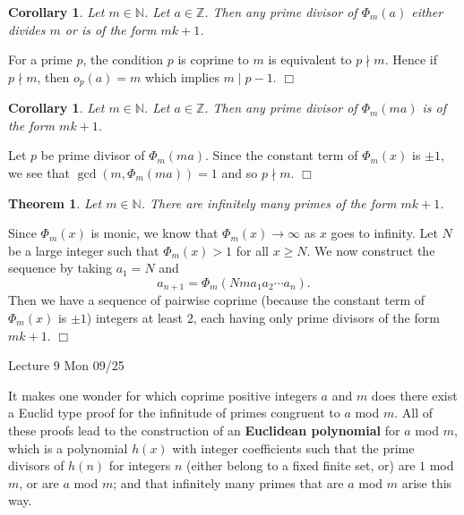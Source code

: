 \documentclass{article}
\def\Z{{\mathbb Z}}
\def\N{{\mathbb N}}
\def\Z{{\mathbb Z}}
\newtheorem{theorem}[subsection]{Theorem}
\newtheorem{cor}[subsection]{Corollary}
\newenvironment{proof}{\noindent {\bf Proof:}}{$\Box$ \vspace{2 ex}}
\newcommand{\add}[1]{{\color{blue} #1}}
\begin{document}
\begin{cor}
    Let $m\in\N$. Let $a\in\Z$. Then any prime divisor of $\Phi_m(a)$ either divides $m$ or is of the form $mk+1$.
\end{cor}

\begin{proof}
    For a prime $p$, the condition $p$ is coprime to $m$ is equivalent to $p\nmid m$. Hence if $p\nmid m$, then $o_p(a) = m$ which implies $m\mid p-1$.
\end{proof}

\begin{cor}
    Let $m\in\N$. Let $a\in\Z$. Then any prime divisor of $\Phi_m(ma)$ is of the form $mk+1$.
\end{cor}

\begin{proof}
    Let $p$ be prime divisor of $\Phi_m(ma)$. Since the constant term of $\Phi_m(x)$ is $\pm1$, we see that $\gcd(m,\Phi_m(ma)) = 1$ and so $p\nmid m$. 
\end{proof}

\begin{theorem}
    Let $m\in\N$. There are infinitely many primes of the form $mk + 1$.
\end{theorem}

\begin{proof}
    Since $\Phi_m(x)$ is monic, we know that $\Phi_m(x)\rightarrow\infty$ as $x$ goes to infinity. Let $N$ be a large integer such that $\Phi_m(x) > 1$ for all $x\geq N$. We now construct the sequence by taking $a_1 = N$ and
    $$a_{n+1} = \Phi_m(Nma_1a_2\cdots a_n).$$
    Then we have a sequence of pairwise coprime (because the constant term of $\Phi_m(x)$ is $\pm1$) integers at least $2$, each having only prime divisors of the form $mk+1$.
\end{proof}

\begin{center}
    \add{Lecture 9 Mon 09/25}
\end{center}

It makes one wonder for which coprime positive integers $a$ and $m$ does there exist a Euclid type proof for the infinitude of primes congruent to $a$ mod $m$. All of these proofs lead to the construction of an \textbf{Euclidean polynomial} for $a$ mod $m$, which is a polynomial $h(x)$ with integer coefficients such that the prime divisors of $h(n)$ for integers $n$ (either belong to a fixed finite set, or) are $1$ mod $m$, or are $a$ mod $m$; and that infinitely many primes that are $a$ mod $m$ arise this way.
\end{document}
